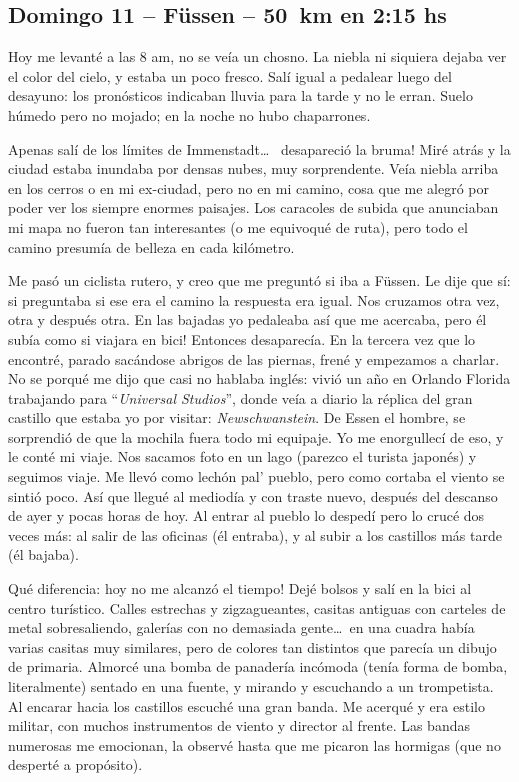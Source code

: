 \subsection*{Domingo 11 -- F\"ussen -- 50~km en 2:15 hs}

Hoy me levant\'e a las 8 am, no se ve\'ia un chosno. La niebla ni siquiera
dejaba ver el color del cielo, y estaba un poco fresco. Sal\'i igual a pedalear
luego del desayuno: los pron\'osticos indicaban lluvia para la tarde y no le
erran. Suelo h\'umedo pero no mojado; en la noche no hubo chaparrones.

Apenas sal\'i de los l\'imites de Immenstadt\ldots\ \textexclamdown
desapareci\'o la bruma! Mir\'e atr\'as y la ciudad estaba inundaba por densas
nubes, muy sorprendente. Ve\'ia niebla arriba en los cerros o en mi ex-ciudad,
pero no en mi camino, cosa que me alegr\'o por poder ver los siempre enormes
paisajes. Los caracoles de subida que anunciaban mi mapa no fueron tan
interesantes (o me equivoqu\'e de ruta), pero todo el camino presum\'ia de
belleza en cada kil\'ometro.

Me pas\'o un ciclista rutero, y creo que me pregunt\'o si iba a F\"ussen. Le
dije que s\'i: si preguntaba si ese era el camino la respuesta era igual. Nos
cruzamos otra vez, otra y despu\'es otra. En las bajadas yo pedaleaba as\'i
que me acercaba, \textexclamdown pero \'el sub\'ia como si viajara en bici!
Entonces desaparec\'ia. En la tercera vez que lo encontr\'e, parado
sac\'andose abrigos de las piernas, fren\'e y empezamos a charlar. No se
porqu\'e me dijo que casi no hablaba ingl\'es: vivi\'o un a\~no en Orlando
Florida trabajando para ``\emph{Universal Studios}'', donde ve\'ia a diario la
r\'eplica del gran castillo que estaba yo por visitar: \emph{Newschwanstein}.
De Essen el hombre, se sorprendi\'o de que la mochila fuera todo mi equipaje.
Yo me enorgullec\'i de eso, y le cont\'e mi viaje. Nos sacamos foto en un lago
(parezco el turista japon\'es) y seguimos viaje. Me llev\'o como lech\'on pal'
pueblo, pero como cortaba el viento se sinti\'o poco. As\'i que llegu\'e al
mediod\'ia y con traste nuevo, despu\'es del descanso de ayer y pocas horas de
hoy. Al entrar al pueblo lo desped\'i pero lo cruc\'e dos veces m\'as: al
salir de las oficinas (\'el entraba), y al subir a los castillos m\'as tarde
(\'el bajaba).

Qu\'e diferencia: \textexclamdown hoy no me alcanz\'o el tiempo! Dej\'e bolsos
y sal\'i en la bici al centro tur\'istico. Calles estrechas y zigzagueantes,
casitas antiguas con carteles de metal sobresaliendo, galer\'ias con no
demasiada gente\ldots\ en una cuadra hab\'ia varias casitas muy similares,
pero de colores tan distintos que parec\'ia un dibujo de primaria. Almorc\'e
una bomba de panader\'ia inc\'omoda (ten\'ia forma de bomba, literalmente)
sentado en una fuente, y mirando y escuchando a un trompetista. Al encarar
hacia los castillos escuch\'e una gran banda. Me acerqu\'e y era estilo
militar, con muchos instrumentos de viento y director al frente. Las bandas
numerosas me emocionan, la observ\'e hasta que me picaron las hormigas (que no
despert\'e a prop\'osito).

